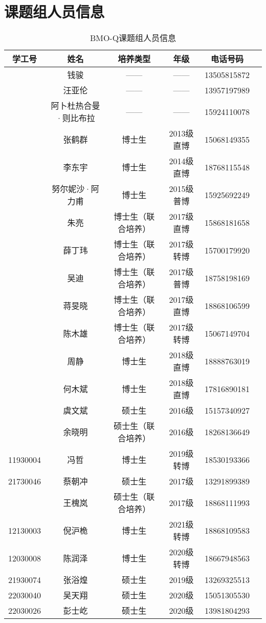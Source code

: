 \documentclass[cn,11pt,chinese]{elegantbook}
\begin{document}
\chapter{课题组人员信息}
\begin{table}[h]
  \centering
  \caption{BMO-Q课题组人员信息}
\begin{tabular}{cccccc}
\toprule
学工号 & 姓名 & 培养类型 & 年级 &电话号码 \\
\midrule
& 钱骏	&——&	——	&13505815872 \\
\hline
\hline
& 汪亚伦&	——&	——	&13957197989\\
&阿卜杜热合曼·则比布拉&	——&	——	&15924110078\\
&张鹤群&	博士生&	2013级直博	&15068149355\\
&李东宇&	博士生	&2014级直博&	18768115548\\
&努尔妮沙·阿力甫&	博士生&	2015级普博&	15925692249\\
&朱亮&	博士生（联合培养）&	2017级直博	&15868181658\\
&薛丁玮	&博士生（联合培养）	&2017级转博	&15700179920\\
&吴迪&	博士生（联合培养）&	2017级普博&	18758198169\\
&蒋旻晓&	博士生（联合培养）&	2017级直博&	18868106599\\
&陈木雄	&博士生（联合培养）&	2017级转博&	15067149704\\
&周静	&博士生	&2018级直博&	18888763019\\
&何木斌&	博士生&	2018级直博&	17816890181\\
&虞文斌	&硕士生&	2016级&	15157340927\\ 
&余晓明	&硕士生（联合培养）&	2016级	&18268136649\\
11930004&冯哲&	博士生&	2019级转博 &	18530193366\\
21730046&蔡朝冲&	硕士生&	2017级&	13291899389\\
&王槐岚	&硕士生（联合培养）&	2017级	&18868111993\\
12130003&倪沪桅	&博士生&	2021级转博&	18868109583\\
12030008&	陈润泽& 博士生&2020级转博&18667948563\\
21930074&张浴煌&硕士生&2019级& 13269325513\\
22030040	&吴天翔& 硕士生&2020级& 15051305530\\
22030026  &彭士屹&硕士生 &2020级 &13981804293 \\

\bottomrule
\end{tabular}%
\label{tab:info}%

\end{table}
\end{document}
